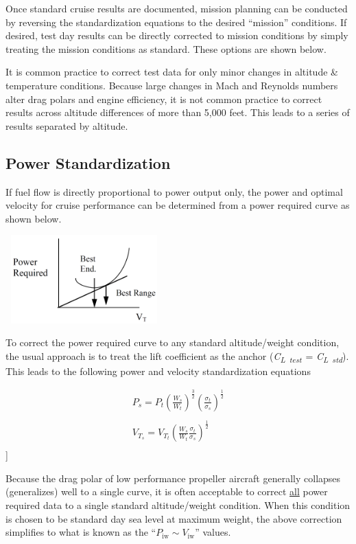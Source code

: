 \documentclass[
]{book}
\begin{document}
Once standard cruise results are documented, mission planning can be conducted
by reversing the standardization equations to the desired ``mission'' conditions.
If desired, test day results can be directly corrected to mission conditions by
simply treating the mission conditions as standard. These options are shown
below.

It is common practice to correct test data for only minor changes in altitude \&
temperature conditions. Because large changes in Mach and Reynolds numbers alter
drag polars and engine efficiency, it is not common practice to correct results
across altitude differences of more than 5,000 feet. This leads to a series of
results separated by altitude.

\hypertarget{power-standardization}{%
\subsection{Power Standardization}\label{power-standardization}}

If fuel flow is directly proportional to power output only, the power and
optimal velocity for cruise performance can be determined from a power required
curve as shown below.

\includegraphics[width=2.38542in,height=1.33542in]{media/12/power-speed-curve.png}

To correct the power required curve to any standard altitude/weight condition, the usual approach is to treat the lift coefficient as the anchor (\emph{C\textsubscript{L~test~}}= \emph{C\textsubscript{L~std}}). This leads to the following power and velocity standardization equations

\begin{align}
P_s = P_t \left( \frac{W_s}{W_t} \right)^{\frac{3}{2}} \left( \frac{\sigma_t}{\sigma_s} \right)^{\frac{1}{2}} \\
\\
V_{T_s} = V_{T_t} \left( \frac{W_s}{W_t} \frac{\sigma_t}{\sigma_s} \right)^{\frac{1}{2}}\\
\end{align}
\label{eq:pwr-vel-std}
{]}

Because the drag polar of low performance propeller aircraft generally collapses
(generalizes) well to a single curve, it is often acceptable to correct
\underline{all} power required data to a single standard altitude/weight
condition. When this condition is chosen to be standard day sea level at maximum
weight, the above correction simplifies to what is known as the
``\(P_{\text{iw}} \sim V_{\text{iw}}\)'' values.
\end{document}
